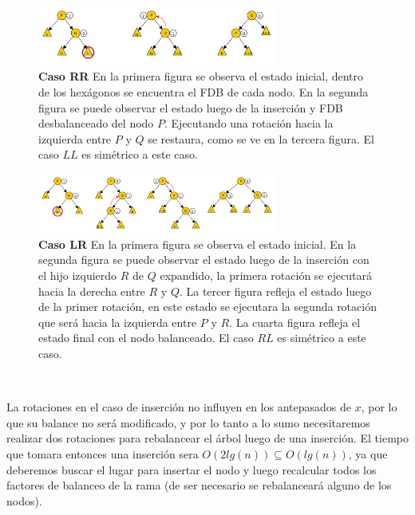 \documentclass[10pt, a4paper]{report}
\begin{document}
~

\begin{figure}
 \centering
 \includegraphics[width=0.70\textwidth]{RotacionSimpleAVL.pdf}
 \caption*{\newline \footnotesize \textbf{Caso RR} En la primera figura se observa el estado inicial, dentro de los hex\'agonos se encuentra el FDB de cada nodo. En la segunda figura se puede observar el estado luego de la inserci\'on y FDB desbalanceado del nodo $P$. Ejecutando una rotaci\'on hacia la izquierda entre $P$ y $Q$ se restaura, como se ve en la tercera figura. El caso $LL$ es sim\'etrico a este caso.}
\end{figure}

\newpage
\begin{figure}
 \centering
 \includegraphics[width=0.70\textwidth]{RotacionDobleAVL.pdf}
 \caption*{\newline \footnotesize \textbf{Caso LR} En la primera figura se observa el estado inicial. En la segunda figura se puede observar el estado luego de la inserci\'on con el hijo izquierdo $R$ de $Q$ expandido, la primera rotaci\'on se ejecutar\'a hacia la derecha entre $R$ y $Q$. La tercer figura refleja el estado luego de la primer rotaci\'on, en este estado se ejecutara la segunda rotaci\'on que ser\'a hacia la izquierda entre $P$ y $R$. La cuarta figura refleja el estado final con el nodo balanceado. El caso $RL$ es sim\'etrico a este caso.}
\end{figure}

~

La rotaciones en el caso de inserci\'on no influyen en los antepasados de $x$, por lo que su balance no ser\'a modificado, y por lo tanto a lo sumo necesitaremos realizar dos rotaciones para rebalancear el \'arbol luego de una inserci\'on. El tiempo que tomara entonces una inserci\'on sera $O(2lg(n)) \subseteq O(lg(n))$, ya que deberemos buscar el lugar para insertar el nodo y luego recalcular todos los factores de balanceo de la rama (de ser necesario se rebalancear\'a alguno de los nodos).
\end{document}
